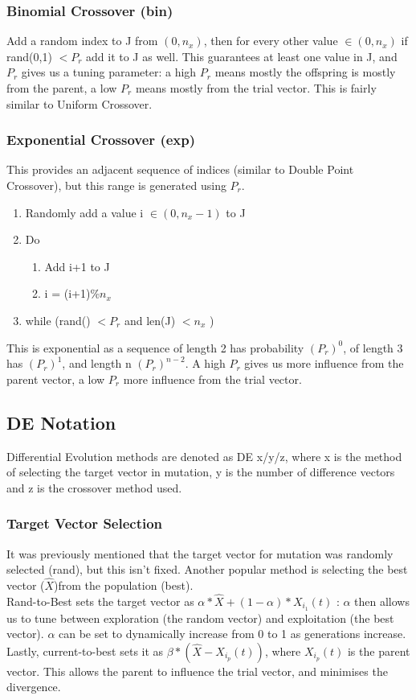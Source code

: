 \subsubsection{Binomial Crossover (bin)}
Add a random index to J from $(0, n_x)$, then for every other value $ \in (0, n_x)$ if rand(0,1) $< P_r$ add it to J as well. This guarantees at least one value in J, and $P_r$ gives us a tuning parameter: a high $P_r$  means mostly the offspring is mostly from the parent, a low $P_r$ means mostly from the trial vector. This is fairly similar to Uniform Crossover.

\subsubsection{Exponential Crossover (exp)}
This provides an adjacent sequence of indices (similar to Double Point Crossover), but this range is generated using $P_r$. 
\begin{enumerate}
    \item Randomly add a value i $ \in (0, n_x-1)$ to J
    \item Do
    \begin{enumerate}
        \item Add i+1 to J
        \item i = (i+1)\%$n_x$
    \end{enumerate}
    \item [] while (rand() $< P_r$ and len(J) $< n_x$ )
\end{enumerate}
This is exponential as a sequence of length 2 has probability $(P_r)^0$, of length 3 has $(P_r)^1$, and length n $(P_r)^{n-2}$. A high $P_r$ gives us more influence from the parent vector, a low $P_r$ more influence from the trial vector.

\subsection{DE Notation}
Differential Evolution methods are denoted as DE x/y/z, where x is the method of selecting the target vector in mutation, y is the number of difference vectors and z is the crossover method used.

\subsubsection{Target Vector Selection}
It was previously mentioned that the target vector for mutation was randomly selected (rand), but this isn't fixed. Another popular method is selecting the best vector ($\hat{X}$)from the population (best).\\
Rand-to-Best sets the target vector as \(\alpha*\hat{X} + (1-\alpha) * X_{i_1}(t)  \) : $\alpha$ then allows us to tune between exploration (the random vector) and exploitation (the best vector). $\alpha$ can be set to dynamically increase from 0 to 1 as generations increase.\\
Lastly, current-to-best sets it as \(\beta * (\hat{X} - X_{i_p}(t)) \), where $X_{i_p}(t)$ is the parent vector. This allows the parent to influence the trial vector, and minimises the divergence.

